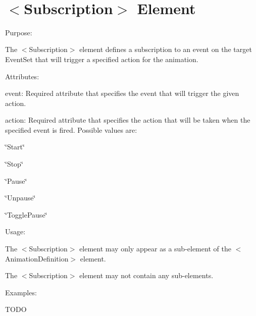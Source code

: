 ~\newline
 \hypertarget{xml_animation_xml_animation_subscription}{}\section{$<$\+Subscription$>$ Element}\label{xml_animation_xml_animation_subscription}

\begin{DoxyItemize}
\item Purpose\+:
\begin{DoxyItemize}
\item The $<$Subscription$>$ element defines a subscription to an event on the target Event\+Set that will trigger a specified action for the animation.
\end{DoxyItemize}
\item Attributes\+:
\begin{DoxyItemize}
\item {\ttfamily event\+:} Required attribute that specifies the event that will trigger the given action.
\item {\ttfamily action\+:} Required attribute that specifies the action that will be taken when the specified event is fired. Possible values are\+:
\begin{DoxyItemize}
\item {\ttfamily \char`\"{}\+Start\char`\"{}} 
\item {\ttfamily \char`\"{}\+Stop\char`\"{}} 
\item {\ttfamily \char`\"{}\+Pause\char`\"{}} 
\item {\ttfamily \char`\"{}\+Unpause\char`\"{}} 
\item {\ttfamily \char`\"{}\+Toggle\+Pause\char`\"{}} 
\end{DoxyItemize}
\end{DoxyItemize}
\item Usage\+:
\begin{DoxyItemize}
\item The $<$Subscription$>$ element may only appear as a sub-\/element of the $<$Animation\+Definition$>$ element.
\item The $<$Subscription$>$ element may not contain any sub-\/elements.
\end{DoxyItemize}
\item Examples\+:
\begin{DoxyItemize}
\item T\+O\+DO 
\end{DoxyItemize}
\end{DoxyItemize}